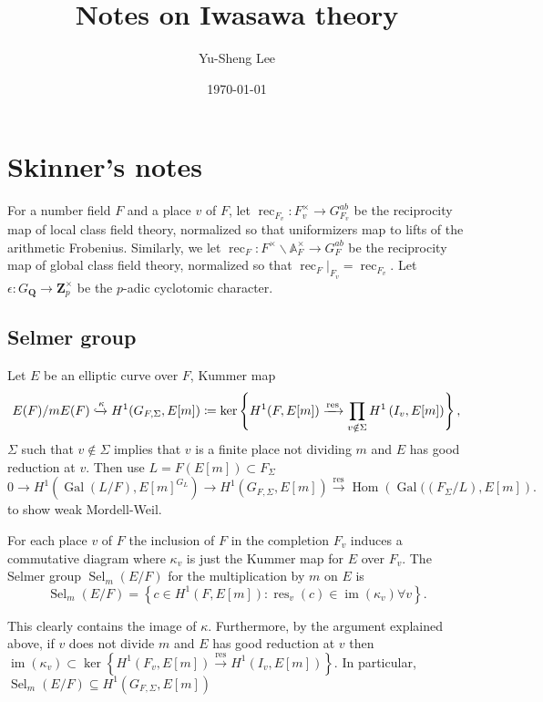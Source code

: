 \documentclass[leqno]{amsart}
\newcommand{\Q}{{\mathbf{Q}}}
\newcommand{\Zp}{\mathbf{Z}_p}
\DeclareMathOperator{\Sel}{Sel}
\DeclareMathOperator{\Gal}{Gal}
\newcommand{\1}{\mathbf{1}}
\DeclareMathOperator{\Hom}{Hom}
\DeclareMathOperator{\res}{res}
\DeclareMathOperator{\rec}{rec}
\theoremstyle{definition}
\theoremstyle{remark}
\begin{document}
\title{Notes on Iwasawa theory}
\author[Y-S.~Lee]{Yu-Sheng Lee}
\address{Department of Mathematics, University  of Michigan, Ann Arbor, MI 48109, USA}
\date{\today}

\maketitle
\setcounter{tocdepth}{1}
\tableofcontents

\section{Skinner's notes}

For a number field $F$ and a place $v$ of $F$,
let $\rec_{F_v}: F_v^{\times} \rightarrow G_{F_v}^{ab}$ 
be the reciprocity map of local class field theory, 
normalized so that uniformizers map to lifts of the arithmetic Frobenius. 
Similarly, we let $\rec_F: F^{\times} \backslash \mathbb{A}_F^{\times} \rightarrow G_F^{ab}$ 
be the reciprocity map of global class field theory, normalized so that 
$\rec_F\vert_{F_v}=\rec_{F_v}$.
Let $\epsilon:G_\Q\to \Zp^\times$ be the $p$-adic cyclotomic character.

\subsection{Selmer group}
Let $E$ be an elliptic curve over $F$,
Kummer map
\[
    E(F)/mE(F)\xhookrightarrow{\kappa}
    H^1(G_{F,\Sigma},E[m])\coloneqq
    \ker\left\{H^1(F, E[m]) 
    \xrightarrow{\res} \prod_{v \notin \Sigma} H^1\left(I_v, E[m]\right)\right\},
\]
$\Sigma$ such that $v\notin \Sigma$ implies
that $v$ is a finite place not dividing $m$ and $E$ has good reduction at $v$.
Then use $L=F(E[m])\subset F_\Sigma$
\[
    0 \rightarrow H^1\left(\Gal(L / F), E[m]^{G_L}\right) \rightarrow H^1\left(G_{F, \Sigma}, E[m]\right) \xrightarrow{\res} \Hom\left(\Gal(\left(F_{\Sigma} / L\right), E[m]\right).
\]
to show weak Mordell-Weil.

For each place $v$ of $F$ the inclusion of $F$ in the completion $F_v$ induces a commutative diagram
where $\kappa_v$ is just the Kummer map for $E$ over $F_v$. The Selmer group $\Sel_m(E / F)$ for the multiplication by $m$ on $E$ is
\[
\Sel_m(E / F)=\left\{c \in H^1(F, E[m]): \res_v(c) \in \operatorname{im}\left(\kappa_v\right) \forall v\right\} .
\]

This clearly contains the image of $\kappa$. Furthermore, by the argument explained above, if $v$ does not divide $m$ and $E$ has good reduction at $v$ then $\operatorname{im}\left(\kappa_v\right) \subset \ker\left\{H^1\left(F_v, E[m]\right) \xrightarrow{\res} H^1\left(I_v, E[m]\right)\right\}$. In particular, $\Sel_m(E / F) \subseteq H^1\left(G_{F, \Sigma}, E[m]\right)$
\end{document}
